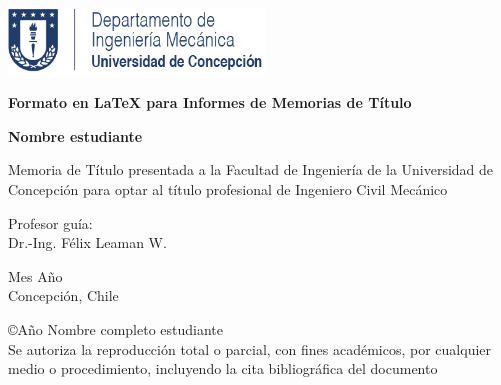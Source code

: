 	
\begin{center}
	
\includegraphics[height=50pt]{udec-dim.png}
\vspace{5cm}


{\Large
\textbf{Formato en \LaTeX{} para Informes de Memorias de Título \\}
}
\vspace{2.5cm}

{\large
\textbf{Nombre estudiante\\}
}
\vspace{2.5cm}

{\normalsize
Memoria de Título presentada a la Facultad de Ingeniería de la Universidad de Concepción para optar al título profesional de Ingeniero Civil Mecánico\\
}
\vspace{2.5cm}


{\normalsize
Profesor guía:\\
Dr.-Ing. Félix Leaman W.
}
\vspace{0.5cm}

{\normalsize
Mes Año\\
Concepción, Chile
}
\vspace*{\fill}




\end{center}

{\footnotesize
\copyright Año Nombre completo estudiante\\
Se autoriza la reproducción total o parcial, con fines académicos, por cualquier medio o procedimiento, incluyendo la cita bibliográfica del documento
}
\vspace{0.5cm}


